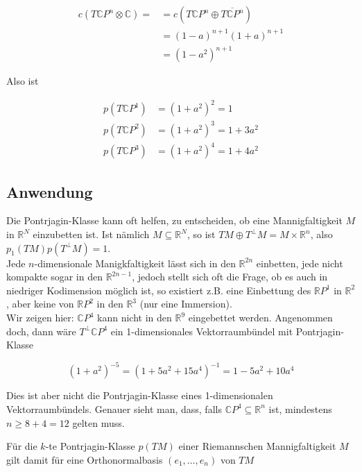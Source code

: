 \documentclass[10pt, letterpaper]{article}
\begin{document}
$$
\begin{aligned}
c\left(T \mathbb{C} P^{n} \otimes \mathbb{C}\right)= & =c\left(T \mathbb{C} P^{n} \oplus \overline{T \mathbb{C} P^{n}}\right) \\
& =(1-a)^{n+1}(1+a)^{n+1} \\
& =\left(1-a^{2}\right)^{n+1}
\end{aligned}
$$

Also ist

$$
\begin{aligned}
p\left(T \mathbb{C} P^{1}\right) & =\left(1+a^{2}\right)^{2}=1 \\
p\left(T \mathbb{C} P^{2}\right) & =\left(1+a^{2}\right)^{3}=1+3 a^{2} \\
p\left(T \mathbb{C} P^{3}\right) & =\left(1+a^{2}\right)^{4}=1+4 a^{2}
\end{aligned}
$$

\subsection*{Anwendung}
Die Pontrjagin-Klasse kann oft helfen, zu entscheiden, ob eine Mannigfaltigkeit $M$ in $\mathbb{R}^{N}$ einzubetten ist. Ist nämlich $M \subseteq \mathbb{R}^{N}$, so ist $T M \oplus T^{\perp} M=M \times \mathbb{R}^{n}$, also $p_{1}(T M) p\left(T^{\perp} M\right)=1$.\\
Jede $n$-dimensionale Manigkfaltigkeit lässt sich in den $\mathbb{R}^{2 n}$ einbetten, jede nicht kompakte sogar in den $\mathbb{R}^{2 n-1}$, jedoch stellt sich oft die Frage, ob es auch in niedriger Kodimension möglich ist, so existiert z.B. eine Einbettung des $\mathbb{R} P^{1}$ in $\mathbb{R}^{2}$, aber keine von $\mathbb{R} P^{2}$ in den $\mathbb{R}^{3}$ (nur eine Immersion).\\
Wir zeigen hier: $\mathbb{C} P^{4}$ kann nicht in den $\mathbb{R}^{9}$ eingebettet werden. Angenommen doch, dann wäre $T^{\perp} \mathbb{C} P^{4}$ ein 1-dimensionales Vektorraumbündel mit Pontrjagin-Klasse

$$
\left(1+a^{2}\right)^{-5}=\left(1+5 a^{2}+15 a^{4}\right)^{-1}=1-5 a^{2}+10 a^{4}
$$

Dies ist aber nicht die Pontrjagin-Klasse eines 1-dimensionalen Vektorraumbündels. Genauer sieht man, dass, falls $\mathbb{C} P^{4} \subseteq \mathbb{R}^{n}$ ist, mindestens $n \geq 8+4=12$ gelten muss.

Für die $k$-te Pontrjagin-Klasse $p(T M)$ einer Riemannschen Mannigfaltigkeit $M$ gilt damit für eine Orthonormalbasis $\left(e_{1}, \ldots, e_{n}\right)$ von $T M$
\end{document}
